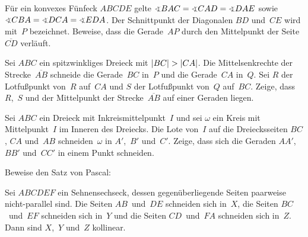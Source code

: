 \begin{aufgabe*}
	Für ein konvexes Fünfeck $ABCDE$ gelte $\winkel BAC=\winkel CAD=\winkel DAE$ sowie $\winkel CBA=\winkel DCA=\winkel EDA$. Der Schnittpunkt der Diagonalen $BD$ und~$CE$ wird mit~$P$ bezeichnet. Beweise, dass die Gerade~$AP$ durch den Mittelpunkt der Seite~$\overline{CD}$ verläuft.
\end{aufgabe*}

\begin{aufgabe*}
	Sei $ABC$ ein spitzwinkliges Dreieck mit $\lvert BC\rvert>\lvert CA\rvert$. Die Mittelsenkrechte der Strecke~$\overline{AB}$ schneide die Gerade~$BC$ in~$P$ und die Gerade~$CA$ in~$Q$. Sei $R$ der Lotfußpunkt von~$R$ auf~$CA$ und $S$ der Lotfußpunkt von~$Q$ auf~$BC$. Zeige, dass $R$,~$S$ und der Mittelpunkt der Strecke~$\overline{AB}$ auf einer Geraden liegen. 
\end{aufgabe*}

\begin{aufgabe*}[*]
	Sei $ABC$ ein Dreieck mit Inkreismittelpunkt~$I$ und sei $\omega$ ein Kreis mit Mittelpunkt~$I$ im Inneren des Dreiecks. Die Lote von~$I$ auf die Dreiecksseiten $BC$, $CA$ und~$AB$ schneiden~$\omega$ in $A'$,~$B'$ und~$C'$. Zeige, dass sich die Geraden $AA'$, $BB'$ und~$CC'$ in einem Punkt schneiden.
\end{aufgabe*}

\begin{aufgabe*}[***]
	Beweise den Satz von Pascal:
	\begin{satzmitnamen}
		Sei $ABCDEF$ ein Sehnensechseck, dessen gegenüberliegende Seiten paarweise nicht-parallel sind. Die Seiten $AB$~und~$DE$ schneiden sich in~$X$, die Seiten $BC$~und~$EF$ schneiden sich in~$Y$ und die Seiten $CD$~und~$FA$ schneiden sich in~$Z$. Dann sind $X$,~$Y$ und~$Z$ kollinear.
	\end{satzmitnamen}
\end{aufgabe*}